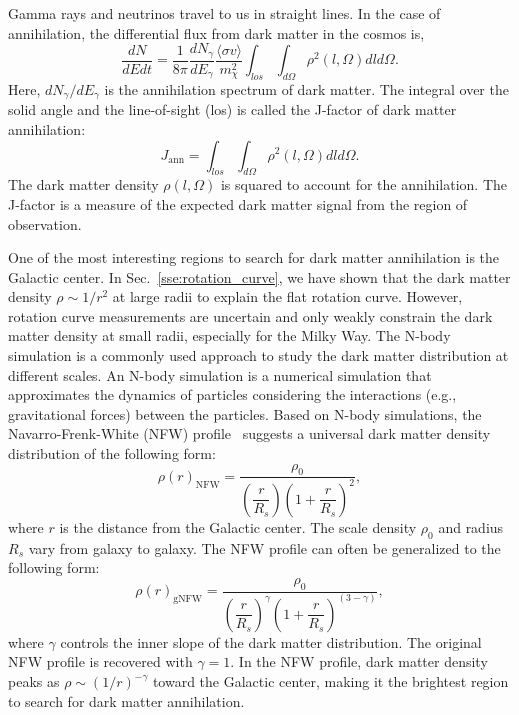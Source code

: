 \documentclass[doublespace,nopageskip]{VTthesis}
\newcommand{\sigmav}{\langle\sigma v\rangle}
\begin{document}
Gamma rays and neutrinos travel to us in straight lines. In the case of annihilation, the differential flux from dark matter in the cosmos is,
\begin{equation}\label{eq:ann}
    \frac{dN}{dEdt} = \frac{1}{8\pi}\frac{dN_\gamma}{dE_\gamma}\frac{\sigmav}{m_\chi^2}\int_{los}\int_{d\Omega}\rho^2(l,\Omega)dld\Omega.
\end{equation}
Here, $dN_\gamma/dE_\gamma$ is the annihilation spectrum of dark matter. The integral over the solid angle and the line-of-sight (los) is called the J-factor of dark matter annihilation:
\begin{equation}\label{eq:jfactor}
    J_\mathrm{ann} = \int_{los}\int_{d\Omega}\rho^2(l,\Omega)dld\Omega.
\end{equation}
The dark matter density $\rho(l,\Omega)$ is squared to account for the annihilation. The J-factor is a measure of the expected dark matter signal from the region of observation.

One of the most interesting regions to search for dark matter annihilation is the Galactic center. In Sec.~\ref{sse:rotation_curve}, we have shown that the dark matter density $\rho \sim 1/r^2$ at large radii to explain the flat rotation curve. However, rotation curve measurements are uncertain and only weakly constrain the dark matter density at small radii, especially for the Milky Way. The N-body simulation is a commonly used approach to study the dark matter distribution at different scales. 
{An N-body simulation is a numerical simulation that approximates the dynamics of particles considering the interactions (e.g., gravitational forces) between the particles.}
Based on N-body simulations, the Navarro-Frenk-White (NFW) profile~\cite{1996ApJ...462..563N} suggests a universal dark matter density distribution of the following form:
\begin{equation}
    \rho(r)_\mathrm{NFW} = \frac{\rho_0}{\left(\dfrac{r}{R_s}\right)\left(1+\dfrac{r}{R_s}\right)^{2}},
\end{equation}
where $r$ is the distance from the Galactic center. The scale density $\rho_0$ and radius $R_s$ vary from galaxy to galaxy.
The NFW profile can often be generalized to the following form:
\begin{equation}
  \rho(r)_\mathrm{gNFW} = \dfrac{\rho_0}{\left(\dfrac{r}{R_s}\right)^\gamma\left(1+\dfrac{r}{R_s}\right)^{(3-\gamma)}},
\end{equation}
where $\gamma$ controls the inner slope of the dark matter distribution. The original NFW profile is recovered with $\gamma=1$.
In the NFW profile, dark matter density peaks as $\rho \sim (1/r)^{-\gamma}$ toward the Galactic center, making it the brightest region to search for dark matter annihilation.
\end{document}
